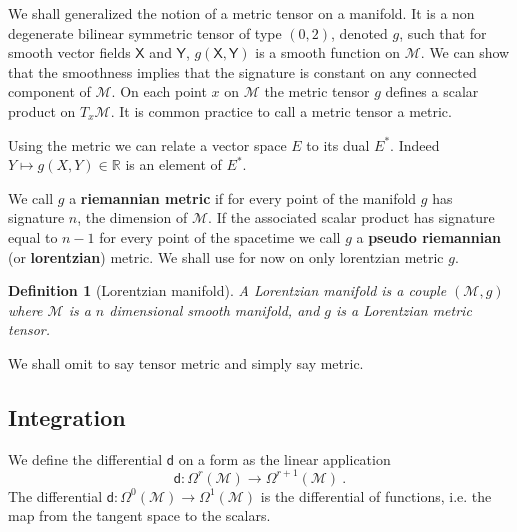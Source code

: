 \documentclass[11pt]{book}
\newcommand{\Mcal}{\mathcal{M}}
\newcommand{\Rbb}{\mathbb{R}}
\newcommand{\Xsf}{\mathsf{X}}
\newcommand{\Ysf}{\mathsf{Y}}
\newcommand{\dsf}{\mathsf{d}}
\theoremstyle{break}
\newtheorem{definition}{Definition}[chapter]
\begin{document}
We shall generalized the notion of a metric tensor on a manifold. It is a non degenerate bilinear symmetric tensor of type $(0,2)$, denoted $g$, such that for smooth vector fields $\Xsf$ and $\Ysf$, $g(\Xsf,\Ysf)$ is a smooth function on $\Mcal$. We can show that the smoothness implies that the signature is constant on any connected component of $\Mcal$. On each point $x$ on $\Mcal$ the metric tensor $g$ defines a scalar product on $T_x\Mcal$. It is common practice to call a metric tensor a metric.


Using the metric we can relate a vector space $E$ to its dual $E^\ast$. Indeed $Y \mapsto g(X,Y) \in \Rbb$ is an element of $E^\ast$. 


We call $g$ a \textbf{riemannian metric} if for every point of the manifold $g$ has signature $n$, the dimension of $\Mcal$. If the associated scalar product has signature equal to $n-1$ for every point of the spacetime we call $g$ a \textbf{pseudo riemannian} (or \textbf{lorentzian}) metric. We shall use for now on only lorentzian metric $g$.

\begin{definition}[Lorentzian manifold]\label{def:lorentzian_M}
A Lorentzian manifold is a couple $(\Mcal,g)$ where $\Mcal$ is a $n$ dimensional smooth manifold, and $g$ is a Lorentzian metric tensor.
\end{definition}


We shall omit to say tensor metric and simply say metric.


\subsection{Integration}
\label{p:INTEGRATION}


We define the differential $\dsf$ on a form as the linear application
%
\begin{equation*}
\dsf : \Omega^r(\Mcal) \to \Omega^{r+1}(\Mcal) \ .
\end{equation*}
%
The differential $\dsf : \Omega^0(\Mcal) \to \Omega^1(\Mcal)$ is the differential of functions, i.e. the map from the tangent space to the scalars.
\end{document}

